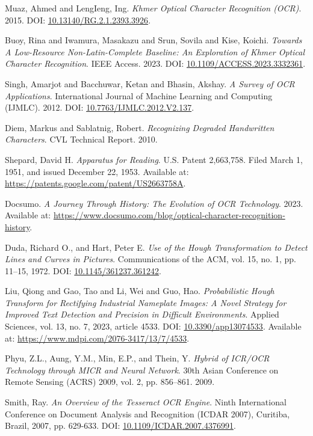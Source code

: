 \label{ch:references}

\begin{thebibliography}{99}

Muaz, Ahmed and LengIeng, Ing. 
\textit{Khmer Optical Character Recognition (OCR)}. 
2015. 
DOI: \href{https://doi.org/10.13140/RG.2.1.2393.3926}{10.13140/RG.2.1.2393.3926}.

Buoy, Rina and Iwamura, Masakazu and Srun, Sovila and Kise, Koichi.
\textit{Towards A Low-Resource Non-Latin-Complete Baseline: An Exploration of Khmer Optical Character Recognition}.
IEEE Access.
2023.
DOI: \href{https://doi.org/10.1109/ACCESS.2023.3332361}{10.1109/ACCESS.2023.3332361}.

Singh, Amarjot and Bacchuwar, Ketan and Bhasin, Akshay.
\textit{A Survey of OCR Applications}.
International Journal of Machine Learning and Computing (IJMLC).
2012.
DOI: \href{https://doi.org/10.7763/IJMLC.2012.V2.137}{10.7763/IJMLC.2012.V2.137}.

Diem, Markus and Sablatnig, Robert.
\textit{Recognizing Degraded Handwritten Characters}.
CVL Technical Report.
2010.

Shepard, David H.
\textit{Apparatus for Reading}.
U.S. Patent 2,663,758. Filed March 1, 1951, and issued December 22, 1953.
Available at: \href{https://patents.google.com/patent/US2663758A}{https://patents.google.com/patent/US2663758A}.

Docsumo.
\textit{A Journey Through History: The Evolution of OCR Technology}.
2023.
Available at: \href{https://www.docsumo.com/blog/optical-character-recognition-history}{https://www.docsumo.com/blog/optical-character-recognition-history}.

Duda, Richard O., and Hart, Peter E.
\textit{Use of the Hough Transformation to Detect Lines and Curves in Pictures}.
Communications of the ACM, vol. 15, no. 1, pp. 11–15, 1972.
DOI: \href{https://doi.org/10.1145/361237.361242}{10.1145/361237.361242}.


Liu, Qiong and Gao, Tao and Li, Wei and Guo, Hao.
\textit{Probabilistic Hough Transform for Rectifying Industrial Nameplate Images: A Novel Strategy for Improved Text Detection and Precision in Difficult Environments}.
Applied Sciences, vol. 13, no. 7, 2023, article 4533.
DOI: \href{https://doi.org/10.3390/app13074533}{10.3390/app13074533}.
Available at: \href{https://www.mdpi.com/2076-3417/13/7/4533}{https://www.mdpi.com/2076-3417/13/7/4533}.


Phyu, Z.L., Aung, Y.M., Min, E.P., and Thein, Y.
\textit{Hybrid of ICR/OCR Technology through MICR and Neural Network}.
30th Asian Conference on Remote Sensing (ACRS) 2009, vol. 2, pp. 856–861.
2009.


Smith, Ray.
\textit{An Overview of the Tesseract OCR Engine}.
Ninth International Conference on Document Analysis and Recognition (ICDAR 2007), Curitiba, Brazil, 2007, pp. 629-633.
DOI: \href{https://doi.org/10.1109/ICDAR.2007.4376991}{10.1109/ICDAR.2007.4376991}.

\end{thebibliography}